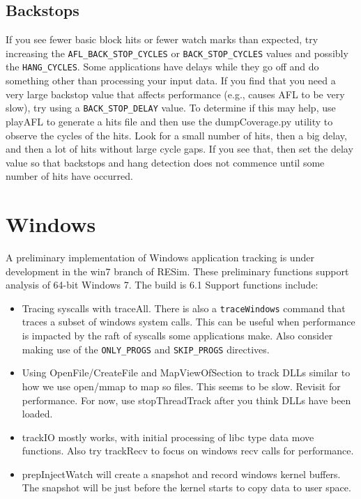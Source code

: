 \documentclass[titlepage]{article}
\begin{document}
\begin{appendices}
\subsection{Backstops}
If you see fewer basic block hits or fewer watch marks than expected, try increasing the {\tt AFL\_BACK\_STOP\_CYCLES} or {\tt BACK\_STOP\_CYCLES} values and possibly the
{\tt HANG\_CYCLES}.  Some applications have delays while they go off and do something other than processing your input data.  If you find that you need a very large backstop
value that affects performance (e.g., causes AFL to be very slow), try using a {\tt BACK\_STOP\_DELAY} value.  To determine if this may help, use 
playAFL to generate a hits file and then use the dumpCoverage.py utility to observe the cycles of the hits.  Look for a small number of hits, then a big delay, and
then a lot of hits without large cycle gaps.  If you see that, then set the delay value so that backstops and hang detection does not commence until some number of hits have
occurred. 

\section{Windows}
\label{Windows}
A preliminary implementation of Windows application tracking is under development in the win7 branch of RESim.
These preliminary functions support analysis of 64-bit Windows 7.  The build is 6.1
Support functions include:
\begin{itemize}
\item Tracing syscalls with traceAll.  There is also a {\tt traceWindows} command that traces a subset of windows system calls.  This can be useful when performance is 
impacted by the raft of syscalls some applications make.  Also consider making use of the {\tt ONLY\_PROGS} and {\tt SKIP\_PROGS} directives.

\item Using OpenFile/CreateFile and MapViewOfSection to track DLLs similar to how we use open/mmap to map so files.  This seems to be slow.
Revisit for performance.  For now, use stopThreadTrack after you think DLLs have been loaded.

\item trackIO mostly works, with initial processing of libc type data move functions.  Also try trackRecv to focus on windows recv calls for performance.  

\item prepInjectWatch will create a snapshot and record windows kernel buffers.  The snapshot will be just before the kernel starts to copy data to user space.


\end{itemize}
\end{appendices}
\end{document}
